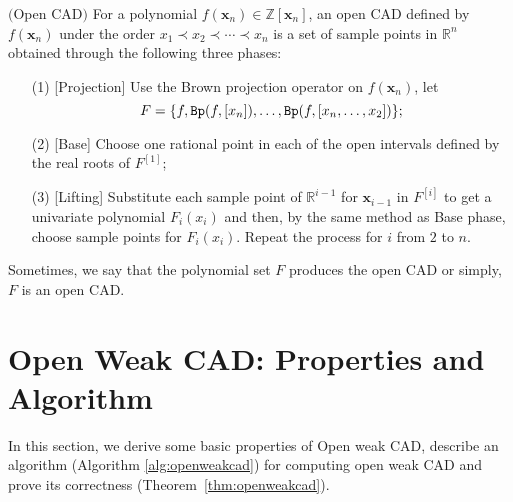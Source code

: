 \documentclass[amsthm]{elsart}
\def \Bproj  {{\tt Bp}}
\def \RR {{\mathbb R}}
\def \ZZ {{\mathbb Z}}
\newcommand{\xx}{\bm{x}}
\begin{document}
\begin{defn} $($Open CAD$)$ \label{def:opencad}
        For a polynomial $f(\xx_n)\in \ZZ[\xx_n]$, an open CAD defined by $f(\xx_n)$ under the order $x_1\prec x_2\prec\cdots\prec x_n$ is a set of sample points in $\RR^n$ obtained through the following three phases:
\begin{enumerate}
       \item[(1)] [Projection] Use the Brown projection operator on $f(\xx_n)$,
                  let $$F=\{f,\Bproj(f,[x_n]),\ldots, \Bproj(f,[x_n,\dots,x_2])\};$$ \item[(2)] [Base] Choose one rational point in each of the open intervals defined by the real roots of $F^{[1]}$; \item[(3)] [Lifting] Substitute each sample point of $\RR^{i-1}$ for $\xx_{i-1}$ in $F^{[i]}$ to get a univariate polynomial $F_{i}(x_i)$ and then, by the same method as Base phase, choose sample points for $F_{i}(x_i)$. Repeat the process for $i$ from $2$ to $n$.
\end{enumerate}
\medskip
Sometimes, we say that the polynomial set $F$ produces the open CAD or simply, $F$ is an open CAD.
\end{defn}

\section{Open Weak CAD: Properties and Algorithm}\label{sec:refined}
In this section, we derive some basic properties of Open weak CAD, describe an algorithm (Algorithm \ref{alg:openweakcad}) for computing open weak CAD
and prove its correctness (Theorem~\ref{thm:openweakcad}). 
\end{document}
